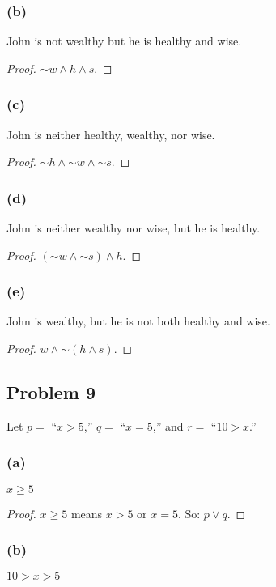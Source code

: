 \documentclass[14pt]{extarticle}
\begin{document}
\subsubsection{(b)}
John is not wealthy but he is healthy and wise.

\begin{proof}
${\sim w} \wedge h \wedge s$.
\end{proof}

\subsubsection{(c)}
John is neither healthy, wealthy, nor wise.

\begin{proof}
${\sim h} \wedge {\sim w} \wedge {\sim s}$.
\end{proof}

\subsubsection{(d)}
John is neither wealthy nor wise, but he is healthy.

\begin{proof}
$({\sim w} \wedge {\sim s}) \wedge h$.
\end{proof}

\subsubsection{(e)}
John is wealthy, but he is not both healthy and wise.

\begin{proof}
$w \wedge {\sim (h \wedge s)}$.
\end{proof}

\subsection{Problem 9}
Let $p =$ “$x > 5$,” $q =$ “$x = 5$,” and $r =$ “$10 > x$.”

\subsubsection{(a)}
$x \geq 5$

\begin{proof}
$x \geq 5$ means $x > 5$ or $x = 5$. So: $p \vee q$.
\end{proof}

\subsubsection{(b)}
$10 > x > 5$
\end{document}
